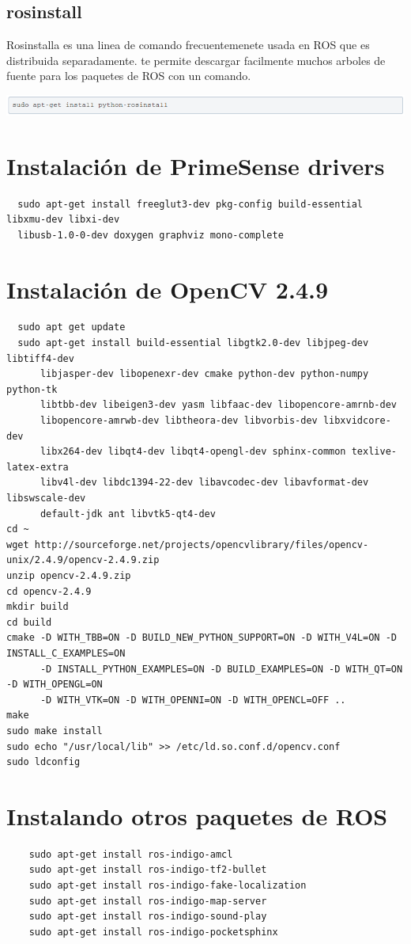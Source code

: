 \documentclass[a4paper,usenames,dvipsnames,svgnames,table]{book}
\begin{document}
\subsection{rosinstall}

Rosinstalla es una linea de comando frecuentemenete usada en ROS que es distribuida separadamente. te permite 
descargar facilmente muchos arboles de fuente para los paquetes de ROS con un comando.

\begin{center}
\includegraphics[width=1\textwidth]{Figures/Software/Install_ROS/Paso_17.png}
\end{center}

\section{Instalación de PrimeSense drivers}
\begin{verbatim}
  sudo apt-get install freeglut3-dev pkg-config build-essential libxmu-dev libxi-dev
  libusb-1.0-0-dev doxygen graphviz mono-complete
\end{verbatim}
\section{Instalación de OpenCV 2.4.9}
\begin{verbatim}
  sudo apt get update
  sudo apt-get install build-essential libgtk2.0-dev libjpeg-dev libtiff4-dev
      libjasper-dev libopenexr-dev cmake python-dev python-numpy python-tk
      libtbb-dev libeigen3-dev yasm libfaac-dev libopencore-amrnb-dev
      libopencore-amrwb-dev libtheora-dev libvorbis-dev libxvidcore-dev
      libx264-dev libqt4-dev libqt4-opengl-dev sphinx-common texlive-latex-extra
      libv4l-dev libdc1394-22-dev libavcodec-dev libavformat-dev libswscale-dev
      default-jdk ant libvtk5-qt4-dev
cd ~
wget http://sourceforge.net/projects/opencvlibrary/files/opencv-unix/2.4.9/opencv-2.4.9.zip
unzip opencv-2.4.9.zip
cd opencv-2.4.9
mkdir build
cd build
cmake -D WITH_TBB=ON -D BUILD_NEW_PYTHON_SUPPORT=ON -D WITH_V4L=ON -D INSTALL_C_EXAMPLES=ON
      -D INSTALL_PYTHON_EXAMPLES=ON -D BUILD_EXAMPLES=ON -D WITH_QT=ON -D WITH_OPENGL=ON
      -D WITH_VTK=ON -D WITH_OPENNI=ON -D WITH_OPENCL=OFF ..
make
sudo make install
sudo echo "/usr/local/lib" >> /etc/ld.so.conf.d/opencv.conf
sudo ldconfig
\end{verbatim}
\section{Instalando otros paquetes de ROS}
\begin{verbatim}
    sudo apt-get install ros-indigo-amcl
    sudo apt-get install ros-indigo-tf2-bullet
    sudo apt-get install ros-indigo-fake-localization
    sudo apt-get install ros-indigo-map-server
    sudo apt-get install ros-indigo-sound-play
    sudo apt-get install ros-indigo-pocketsphinx
\end{verbatim}
\end{document}
